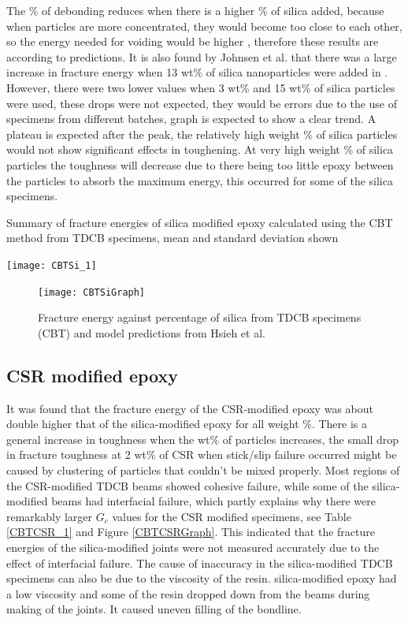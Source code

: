 \documentclass[numbers=noendperiod,chapterprefix=on]{icldt} %
\begin{document}
The \% of debonding reduces when there is a higher \% of silica added, because when particles are more concentrated, they would become too close to each other, so the energy needed for voiding would be higher \cite{Mohammed2008}, therefore these results are according to predictions. It is also found by Johnsen et al. \cite{Mohammed2008} that there was a large increase in fracture energy when 13 wt\% of silica nanoparticles were added in \cite{Mohammed2008}. However, there were two lower values when 3 wt\% and 15 wt\% of silica particles were used, these drops were not expected, they would be errors due to the use of specimens from different batches, graph is expected to show a clear trend. A plateau is expected after the peak, the relatively high weight \% of silica particles would not show significant effects in toughening. At very high weight \% of silica particles the toughness will decrease due to there being too little epoxy between the particles to absorb the maximum energy, this occurred for some of the silica specimens. 
\begin{table}[!htpb]
\centering
\caption{Summary of fracture energies of silica modified epoxy calculated using the CBT method from TDCB specimens, mean and standard deviation shown} \label{CBTSi_1}
\texttt{[image: CBTSi\_1]}
\end{table}
\FloatBarrier

\begin{figure}[!htpb]
\centering
\texttt{[image: CBTSiGraph]}
\caption{Fracture energy against percentage of silica from TDCB specimens (CBT) and model predictions from Hsieh et al. \cite{Huang1992b,Bagheri2000} \\%
} \label{CBTSiGraph}
\end{figure}
\FloatBarrier

\subsection{CSR modified epoxy}
It was found that the fracture energy of the CSR-modified epoxy was about double higher that of the silica-modified epoxy for all weight \%. There is a general increase in toughness when the wt\% of particles increases, the small drop in fracture toughness at 2 wt\% of CSR when stick/slip failure occurred might be caused by clustering of particles that couldn't be mixed properly. Most regions of the CSR-modified TDCB beams showed cohesive failure, while some of the silica-modified beams had interfacial failure, which partly explains why there were remarkably larger $G_c$ values for the CSR modified specimens, see Table \ref{CBTCSR_1} and Figure \ref{CBTCSRGraph}. This indicated that the fracture energies of the silica-modified joints were not measured accurately due to the effect of interfacial failure.
The cause of inaccuracy in the silica-modified TDCB specimens can also be due to the viscosity of the resin. silica-modified epoxy had a low viscosity and some of the resin dropped down from the beams during making of the joints. It caused uneven filling of the bondline. %
\end{document}
